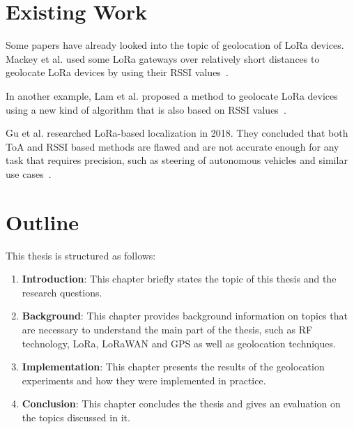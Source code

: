\section{Existing Work}

Some papers have already looked into the topic of geolocation of \ac{LoRa} devices.
Mackey et al. used some \ac{LoRa} gateways over relatively short distances to geolocate \ac{LoRa} devices by using their \ac{RSSI} values~\cite{mackey_lora-based_2019}.

In another example, Lam et al. proposed a method to geolocate \ac{LoRa} devices using a new kind of algorithm that is also based on \ac{RSSI} values~\cite{lam_new_2018}.

Gu et al. researched \ac{LoRa}-based localization in 2018.
They concluded that both \ac{ToA} and \ac{RSSI} based methods are flawed and are not accurate enough for any task that requires precision, such as steering of autonomous vehicles and similar use cases~\cite{gu_lora-based_2018}.

\section{Outline}

This thesis is structured as follows:

\begin{enumerate}
    \item \textbf{Introduction}:
          This chapter briefly states the topic of this thesis and the research questions.
    \item \textbf{Background}:
          This chapter provides background information on topics that are necessary to understand the main part of the thesis, such as \ac{RF} technology, \ac{LoRa}, \ac{LoRaWAN} and \ac{GPS} as well as geolocation techniques.
    \item \textbf{Implementation}:
          This chapter presents the results of the geolocation experiments and how they were implemented in practice.
    \item \textbf{Conclusion}:
          This chapter concludes the thesis and gives an evaluation on the topics discussed in it.
\end{enumerate}